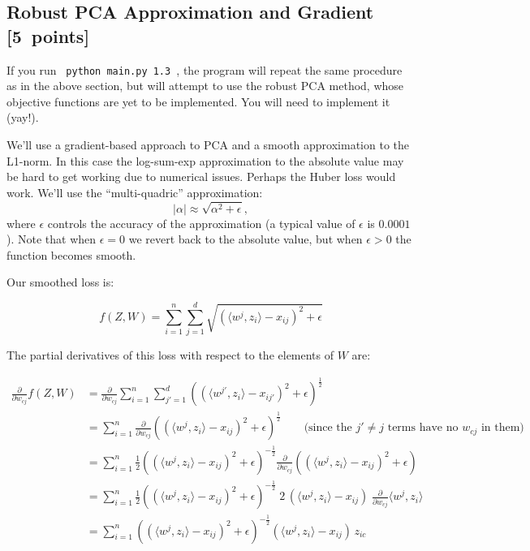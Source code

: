 \documentclass{article}
\newcommand\pts[1]{\textcolor{pointscolour}{[#1~points]}}
\begin{document}
\subsection{Robust PCA Approximation and Gradient \pts{5}}

If you run \verb| python main.py 1.3 |, the program will repeat the same procedure as in the above section, but will attempt to use the robust PCA method, whose objective functions are yet to be implemented. You will need to implement it (yay!).

We'll use a gradient-based approach to PCA and a smooth approximation to the L1-norm. In this case the log-sum-exp approximation to the absolute value may be hard to get working due to numerical issues. Perhaps the Huber loss would work. We'll use the ``multi-quadric'' approximation:
\[
|\alpha| \approx \sqrt{\alpha^2 + \epsilon},
\]
where $\epsilon$ controls the accuracy of the approximation (a typical value of $\epsilon$ is $0.0001$). Note that when $\epsilon=0$ we revert back to the absolute value, but when $\epsilon>0$ the function becomes smooth.

Our smoothed loss is:

\[
f(Z,W) = \sum_{i=1}^n\sum_{j=1}^d \sqrt{(\langle w^j, z_i\rangle - x_{ij})^2 + \epsilon }
\]

The partial derivatives of this loss with respect to the elements of $W$ are:

\begin{align*}
\frac{\partial}{\partial w_{cj}} f(Z,W)
  &= \frac{\partial}{\partial w_{cj}} \sum_{i=1}^n\sum_{j'=1}^d \left( (\langle w^{j'}, z_i\rangle - x_{ij'})^2 + \epsilon \right)^{\frac12} \\
  &= \sum_{i=1}^n \frac{\partial}{\partial w_{cj}} \left( (\langle w^{j}, z_i\rangle - x_{ij})^2 + \epsilon \right)^{\frac12}  \qquad \text{(since the $j' \ne j$ terms have no $w_{cj}$ in them)} \\
  &= \sum_{i=1}^n \frac12 \left( (\langle w^{j}, z_i\rangle - x_{ij})^2 + \epsilon \right)^{-\frac12} \frac{\partial}{\partial w_{cj}} \left( (\langle w^{j}, z_i\rangle - x_{ij})^2 + \epsilon \right) \\
  &= \sum_{i=1}^n \frac12  \left( (\langle w^{j}, z_i\rangle - x_{ij})^2 + \epsilon \right)^{-\frac12} \;2\,  (\langle w^{j}, z_i\rangle - x_{ij}) \; \frac{\partial}{\partial w_{cj}} \langle w^{j}, z_i\rangle \\
  &= \sum_{i=1}^n \left( (\langle w^{j}, z_i\rangle - x_{ij})^2 + \epsilon \right)^{-\frac12}  (\langle w^j, z_i\rangle - x_{ij}) \, z_{ic}
\end{align*}
\end{document}
